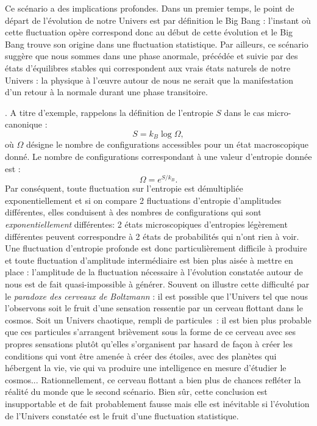 Ce scénario a des implications profondes. Dans un premier temps, le point de départ de l'évolution de notre Univers est par définition le Big Bang : l'instant où cette fluctuation opère correspond donc au début de cette évolution et le Big Bang trouve son origine dans une fluctuation statistique. Par ailleurs, ce scénario suggère que nous sommes dans une phase anormale, précédée et suivie par des états d'équilibres stables qui correspondent aux vrais états naturels de notre Univers : la physique à l'œuvre autour de nous ne serait que la manifestation d'un retour à la normale durant une phase transitoire.

. A titre d'exemple, rappelons la définition de l'entropie $S$ dans le cas micro-canonique :
\begin{equation}
S=k_B\log{\Omega},
\end{equation}
où $\Omega$ désigne le nombre de configurations accessibles pour un état macroscopique donné. Le nombre de configurations correspondant à une valeur d'entropie donnée est :
\begin{equation}
\Omega=e^{S/k_B}.
\end{equation}
Par conséquent, toute fluctuation sur l'entropie est démultipliée exponentiellement et si on compare 2 fluctuations d'entropie d'amplitudes différentes, elles conduisent à des nombres de configurations qui sont \textit{exponentiellement} différentes: 2 états microscopiques d'entropies légèrement différentes peuvent correspondre à 2 états de probabilités qui n'ont rien à voir. Une fluctuation d'entropie profonde est donc particulièrement difficile à produire et toute fluctuation d'amplitude intermédiaire est bien plus aisée à mettre en place : l'amplitude de la fluctuation nécessaire à l'évolution constatée autour de nous est de fait quasi-impossible à générer. Souvent on illustre cette difficulté par le \textit{paradoxe des cerveaux de Boltzmann} : il est possible que l'Univers tel que nous l'observons soit le fruit d'une sensation ressentie par un cerveau flottant dans le cosmos. Soit un Univers chaotique, rempli de particules~: il est bien plus probable que ces particules s'arrangent brièvement sous la forme de ce cerveau avec ses propres sensations plutôt qu'elles s'organisent par  hasard de façon à créer les conditions qui vont être amenée à créer des étoiles, avec des planètes qui hébergent la vie, vie qui va produire une intelligence en mesure d'étudier le cosmos... Rationnellement, ce cerveau flottant a bien plus de chances refléter la réalité du monde que le second scénario. Bien sûr, cette conclusion est insupportable et de fait probablement fausse mais elle est inévitable si l'évolution de l'Univers constatée est le fruit d'une fluctuation statistique.

